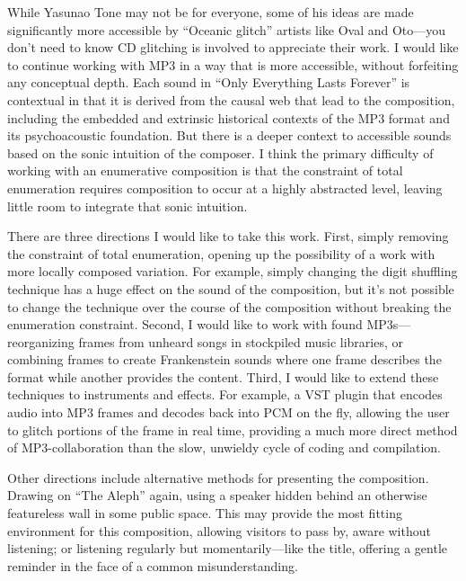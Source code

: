 \documentclass{thesis}
\begin{document}
While Yasunao Tone may not be for everyone, some of his ideas are made significantly more accessible by ``Oceanic glitch''\cite{Sangild04} artists like Oval and Oto---you don't need to know CD glitching is involved to appreciate their work. I would like to continue working with MP3 in a way that is more accessible, without forfeiting any conceptual depth. Each sound in ``Only Everything Lasts Forever'' is contextual in that it is derived from the causal web that lead to the composition, including the embedded and extrinsic historical contexts of the MP3 format and its psychoacoustic foundation. But there is a deeper context to accessible sounds based on the sonic intuition of the composer. I think the primary difficulty of working with an enumerative composition is that the constraint of total enumeration requires composition to occur at a highly abstracted level, leaving little room to integrate that sonic intuition.

There are three directions I would like to take this work. First, simply removing the constraint of total enumeration, opening up the possibility of a work with more locally composed variation. For example, simply changing the digit shuffling technique has a huge effect on the sound of the composition, but it's not possible to change the technique over the course of the composition without breaking the enumeration constraint. Second, I would like to work with found MP3s---reorganizing frames from unheard songs in stockpiled music libraries, or combining frames to create Frankenstein sounds where one frame describes the format while another provides the content. Third, I would like to extend these techniques to instruments and effects. For example, a VST plugin that encodes audio into MP3 frames and decodes back into PCM on the fly, allowing the user to glitch portions of the frame in real time, providing a much more direct method of MP3-collaboration than the slow, unwieldy cycle of coding and compilation.

Other directions include alternative methods for presenting the composition. Drawing on ``The Aleph'' again, using a speaker hidden behind an otherwise featureless wall in some public space. This may provide the most fitting environment for this composition, allowing visitors to pass by, aware without listening; or listening regularly but momentarily---like the title, offering a gentle reminder in the face of a common misunderstanding.

\begin{singlespace}

\end{singlespace}
\end{document}

